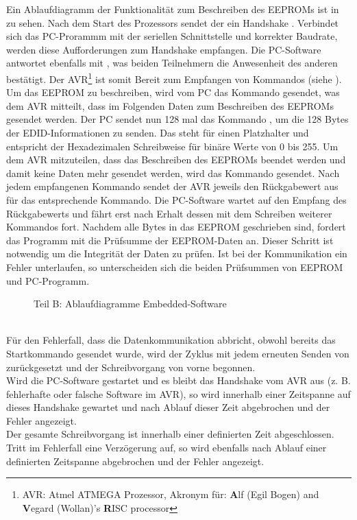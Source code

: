 Ein Ablaufdiagramm der Funktionalität zum Beschreiben des EEPROMs ist in  zu sehen. Nach dem Start des Prozessors sendet der ein Handshake . Verbindet sich das PC-Prorammm mit der seriellen Schnittstelle und korrekter Baudrate, werden diese Aufforderungen zum Handshake empfangen. Die PC-Software antwortet ebenfalls mit , was beiden Teilnehmern die Anwesenheit des anderen bestätigt. Der AVR\footnote{AVR: Atmel ATMEGA Prozessor, Akronym für: \textbf{A}lf (Egil Bogen) and \textbf{V}egard (Wollan)'s \textbf{R}ISC processor} ist somit Bereit zum Empfangen von Kommandos (siehe ). Um das EEPROM zu beschreiben, wird vom PC das Kommando  gesendet, was dem AVR mitteilt, dass im Folgenden Daten zum Beschreiben des EEPROMs gesendet werden. Der PC sendet nun 128 mal das Kommando , um die 128 Bytes der EDID-Informationen zu senden. Das  steht für einen Platzhalter und entspricht der Hexadezimalen Schreibweise für binäre Werte von 0 bis 255. Um dem AVR mitzuteilen, dass das Beschreiben des EEPROMs beendet werden und damit keine Daten mehr gesendet werden, wird das Kommando  gesendet. Nach jedem empfangenen Kommando sendet der AVR jeweils den Rückgabewert aus  für das entsprechende Kommando. Die PC-Software wartet auf den Empfang des Rückgabewerts und fährt erst nach Erhalt dessen mit dem Schreiben weiterer Kommandos fort. Nachdem alle Bytes in das EEPROM geschrieben sind, fordert das Programm mit  die Prüfsumme der EEPROM-Daten an. Dieser Schritt ist notwendig um die Integrität der Daten zu prüfen. Ist bei der Kommunikation ein Fehler unterlaufen, so unterscheiden sich die beiden Prüfsummen von EEPROM und PC-Programm.\\
\begin{figure}[htp]
	\center
    \caption{Teil B: Ablaufdiagramme Embedded-Software}
    \label{fig:ablaufdiagramm_avr} 
\end{figure}\\

Für den Fehlerfall, dass die Datenkommunikation abbricht, obwohl bereits das Startkommando  gesendet wurde, wird der Zyklus mit jedem erneuten Senden von  zurückgesetzt und der Schreibvorgang von vorne begonnen.\\
Wird die PC-Software gestartet und es bleibt das Handshake vom AVR aus (z. B. fehlerhafte oder falsche Software im AVR), so wird innerhalb einer Zeitspanne auf dieses Handshake gewartet und nach Ablauf dieser Zeit abgebrochen und der Fehler angezeigt.\\
Der gesamte Schreibvorgang ist innerhalb einer definierten Zeit abgeschlossen. Tritt im Fehlerfall eine Verzögerung auf, so wird ebenfalls nach Ablauf einer definierten Zeitspanne abgebrochen und der Fehler angezeigt.
